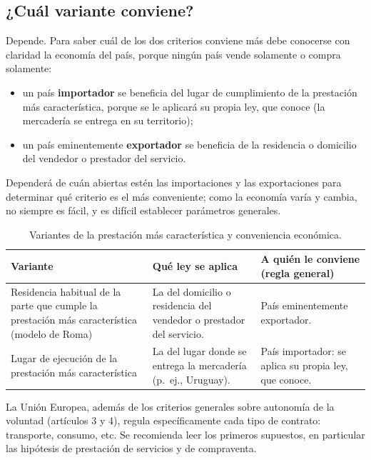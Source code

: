 \documentclass[12pt,oneside]{book}
\begin{document}
\subsection{¿Cuál variante conviene?}

Depende. Para saber cuál de los dos criterios conviene más debe conocerse con claridad la economía del país, porque ningún país vende solamente o compra solamente:

\begin{itemize}
    \item un país \textbf{importador} se beneficia del lugar de cumplimiento de la prestación más característica, porque se le aplicará su propia ley, que conoce (la mercadería se entrega en su territorio);
    \item un país eminentemente \textbf{exportador} se beneficia de la residencia o domicilio del vendedor o prestador del servicio.
\end{itemize}

Dependerá de cuán abiertas estén las importaciones y las exportaciones para determinar qué criterio es el más conveniente; como la economía varía y cambia, no siempre es fácil, y es difícil establecer parámetros generales.

\begin{table}[H]
\centering
\small
\caption{Variantes de la prestación más característica y conveniencia económica.}
\begin{tabularx}{\textwidth}{>{\raggedright\arraybackslash}p{} Y Y}
\toprule
\textbf{Variante} & \textbf{Qué ley se aplica} & \textbf{A quién le conviene (regla general)} \\
\midrule
Residencia habitual de la parte que cumple la prestación más característica (modelo de Roma) & La del domicilio o residencia del vendedor o prestador del servicio. & País eminentemente exportador. \\
Lugar de ejecución de la prestación más característica & La del lugar donde se entrega la mercadería (p.\ ej., Uruguay). & País importador: se aplica su propia ley, que conoce. \\
\bottomrule
\end{tabularx}
\end{table}

La Unión Europea, además de los criterios generales sobre autonomía de la voluntad (artículos 3 y 4), regula específicamente cada tipo de contrato: transporte, consumo, etc. Se recomienda leer los primeros supuestos, en particular las hipótesis de prestación de servicios y de compraventa.
\end{document}
